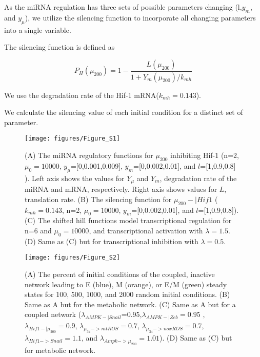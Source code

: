 \documentclass{article}
\begin{document}
As the miRNA regulation has three sets of possible parameters changing (l,$y_m$, and $y_\mu$), we utilize the silencing function to incorporate all changing parameters into a single variable. 

The silencing function is defined as 

\begin{equation}
P_H(\mu_{200})=1- \frac{L(\mu_{200})}{1+Y_m(\mu_{200})/k_{mh}}
\end{equation}

We use the degradation rate of the Hif-1 mRNA($k_{mh}=0.143$).

We calculate the silencing value of each initial condition for a distinct set of parameter. 





\FloatBarrier
\newpage


\begin{figure}
\texttt{[image: figures/Figure\_S1]}
\caption{(A) The miRNA regulatory functions for $\mu_{200}$ inhibiting Hif-1 (n=2, $\mu_0=10000$,  $y_\mu$=[0,0.001,0.009], $y_m$=[0,0.002,0.01], and $l$=[1,0.9,0.8] ). Left axis shows the values for $Y_\mu$ and $Y_m$, degradation rate of the miRNA and mRNA, respectively. Right axis shows values for $L$, translation rate. (B) The silencing function for $\mu_{200} -| Hif1$ ($k_{mh}=0.143$, n=2,  $\mu_0=10000$, $y_m$=[0,0.002,0.01], and $l$=[1,0.9,0.8]). (C) The shifted hill functions model transcriptional regulation for n=6 and $\mu_0=10000$, and transcriptional activation with $\lambda = 1.5$. (D) Same as (C) but for transcriptional inhibition with $\lambda=0.5$.}
\end{figure}

\begin{figure}
\texttt{[image: figures/Figure\_S2]}
\caption{(A) The percent of initial conditions of the coupled, inactive network leading to E (blue), M (orange), or E/M (green) steady states for 100, 500, 1000, and 2000 random initial conditions. (B) Same as A but for the metabolic network. (C) Same as A but for a coupled network ($\lambda_{AMPK-|Snail}$=0.95,$\lambda_{AMPK-|Zeb}=0.95$ , $\lambda_{Hif1-|\mu_{200}}=0.9$, $\lambda_{\mu_{34}->mtROS}=0.7$, $\lambda_{\mu_{34}->noxROS}=0.7$, $\lambda_{Hif1->Snail}=1.1$, and $\lambda_{Ampk->\mu_{200}} = 1.01$). (D) Same as (C) but for metabolic network.}
\label{fig:s2}
\end{figure}
\end{document}
